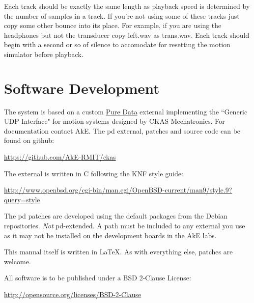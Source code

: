 \documentclass{article}
\begin{document}
	Each track should be exactly the same length as playback speed is 
	determined by the number of samples in a track. If you're not using some of 
	these tracks just copy some other bounce into its place. For example, if 
	you are using the headphones but not the transducer copy left.wav as 
	trans.wav. Each track should begin with a second or so of silence to 
	accomodate for resetting the motion simulator before playback. 

	\newpage
	\section{Software Development}
	\label{dev}
	The system is based on a custom \href{http://puredata.info}{Pure Data} 
	external implementing the ``Generic UDP Interface" for motion systems 
	designed by CKAS Mechatronics. For documentation contact AkE. The pd
	external, patches and source code can be found on github:

	\url{https://github.com/AkE-RMIT/ckas}\medskip

	The external is written in C following the KNF style guide: 
	
	\url{http://www.openbsd.org/cgi-bin/man.cgi/OpenBSD-current/man9/style.9?query=style}\medskip

	The pd patches are developed using the default packages from the Debian 
	repositories. \emph{Not} pd-extended. A path must be included to any 
	external you use as it may not be installed on the development boards in 
	the AkE labs.\medskip

	This manual itself is written in \LaTeX. As with everything else, patches 
	are welcome.\medskip

	All software is to be published under a BSD 2-Clause License:

	\url{http://opensource.org/licenses/BSD-2-Clause}
\end{document}
